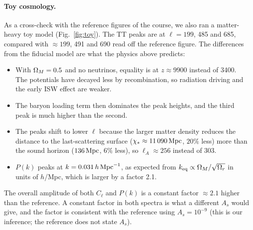 \paragraph*{Toy cosmology.} As a cross-check with the reference figures of the course, we also ran a matter-heavy toy
model (Fig.~\ref{fig:toy}). The TT peaks are at $\ell=199$, 485 and 685, compared with $\approx199$, 491 and 690 read off
the reference figure. The differences from the fiducial model are what the physics above predicts:
\begin{itemize}
\item With $\Omega_M=0.5$ and no neutrinos, equality is at $z\approx9900$ instead of 3400. The potentials have decayed
      less by recombination, so radiation driving and the early ISW effect are weaker.
\item The baryon loading term then dominates the peak heights, and the third peak is much higher than the second.
\item The peaks shift to lower $\ell$ because the larger matter density reduces the distance to the last-scattering
      surface ($\chi_*\approx11\,090\,\mathrm{Mpc}$, $20\%$ less) more than the sound horizon ($136\,\mathrm{Mpc}$, $6\%$ less), so
      $\ell_A\approx256$ instead of 303.
\item $P(k)$ peaks at $k=0.031\,h\,\mathrm{Mpc}^{-1}$, as expected from $k_{\rm eq}\propto\Omega_M/\sqrt{\Omega_r}$ in units of $h$/Mpc,
      which is larger by a factor 2.1.
\end{itemize}
The overall amplitude of both $C_\ell$ and $P(k)$ is a constant factor $\approx2.1$ higher than the reference. A constant
factor in both spectra is what a different $A_s$ would give, and the factor is consistent with the reference using
$A_s=10^{-9}$ (this is our inference; the reference does not state $A_s$).
